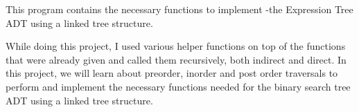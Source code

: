 This program contains the necessary functions to implement -\/the Expression Tree A\+DT using a linked tree structure.

While doing this project, I used various helper functions on top of the functions that were already given and called them recursively, both indirect and direct. In this project, we will learn about preorder, inorder and post order traversals to perform and implement the necessary functions needed for the binary search tree A\+DT using a linked tree structure. 